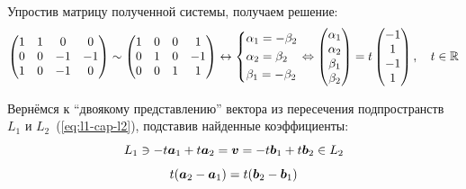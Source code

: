 \documentclass[a4paper,12pt]{article}
\begin{document}
  Упростив матрицу полученной системы, получаем решение:
  \begin{equation}\label{eq:matrix-simplification-in-example}
    \begin{pmatrix}
      1 & 1 &  0 &  0\\
      0 & 0 & -1 & -1\\
      1 & 0 & -1 &  0\\
    \end{pmatrix} \sim \begin{pmatrix}
      1 & 0 & 0 & 1\\
      0 & 1 & 0 & -1\\
      0 & 0 & 1 & 1
    \end{pmatrix}
    \leftrightarrow \left\{
      \begin{aligned}
        &\alpha_1 = -\beta_2\\
        &\alpha_2 = \beta_2\\
        &\beta_1 = -\beta_2
      \end{aligned}
    \right.
    \Leftrightarrow
    \begin{pmatrix}
      \alpha_1\\
      \alpha_2\\
      \beta_1\\
      \beta_2
    \end{pmatrix} = t \begin{pmatrix}
      -1\\
      1\\
      -1\\
      1
    \end{pmatrix},\quad t \in \operatorname{\mathbb R}
  \end{equation}

  Вернёмся к ``двоякому представлению'' вектора из пересечения подпространств $L_1$ и $L_2$~(\ref{eq:l1-cap-l2}), подставив найденные коэффициенты:
  \[
    L_1 \ni -t \boldsymbol a_1 + t \boldsymbol a_2 = \boldsymbol v = -t \boldsymbol b_1 + t \boldsymbol b_2 \in L_2
  \]
  \[
    t (\boldsymbol a_2 - \boldsymbol a_1) = t (\boldsymbol b_2 - \boldsymbol b_1)
  \]
\end{document}
